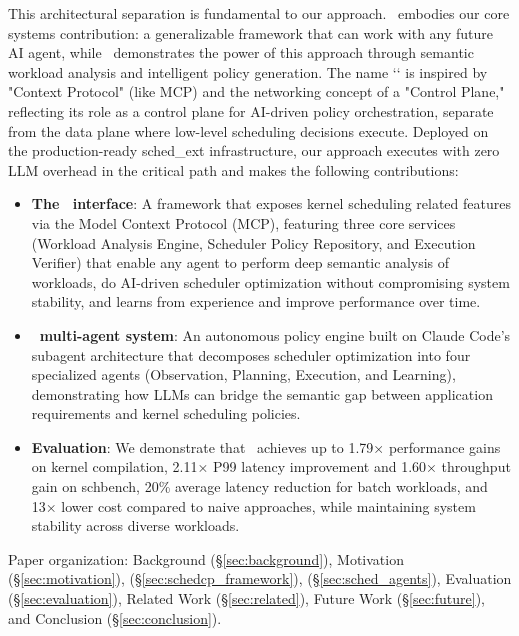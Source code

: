This architectural separation is fundamental to our approach. \sys\ embodies our core systems contribution: a generalizable framework that can work with any future AI agent, while \agent\ demonstrates the power of this approach through semantic workload analysis and intelligent policy generation. The name `\sys` is inspired by "Context Protocol" (like MCP) and the networking concept of a "Control Plane," reflecting its role as a control plane for AI-driven policy orchestration, separate from the data plane where low-level scheduling decisions execute. Deployed on the production-ready sched\_ext infrastructure, our approach executes with zero LLM overhead in the critical path and makes the following contributions:

\begin{itemize}
    \item \textbf{The \sys\ interface}: A framework that exposes kernel scheduling related features via the Model Context Protocol (MCP), featuring three core services (Workload Analysis Engine, Scheduler Policy Repository, and Execution Verifier) that enable any agent to perform deep semantic analysis of workloads, do AI-driven scheduler optimization without compromising system stability, and learns from experience and improve performance over time.
    \item \textbf{\agent\ multi-agent system}: An autonomous policy engine built on Claude Code's subagent architecture that decomposes scheduler optimization into four specialized agents (Observation, Planning, Execution, and Learning), demonstrating how LLMs can bridge the semantic gap between application requirements and kernel scheduling policies.
    \item \textbf{Evaluation}: We demonstrate that \agent\ achieves up to 1.79× performance gains on kernel compilation, 2.11× P99 latency improvement and 1.60× throughput gain on schbench, 20\% average latency reduction for batch workloads, and 13× lower cost compared to naive approaches, while maintaining system stability across diverse workloads.
\end{itemize}

Paper organization: Background (§\ref{sec:background}), Motivation (§\ref{sec:motivation}), \sys (§\ref{sec:schedcp_framework}), \agent (§\ref{sec:sched_agents}), Evaluation (§\ref{sec:evaluation}), Related Work (§\ref{sec:related}), Future Work (§\ref{sec:future}), and Conclusion (§\ref{sec:conclusion}).
